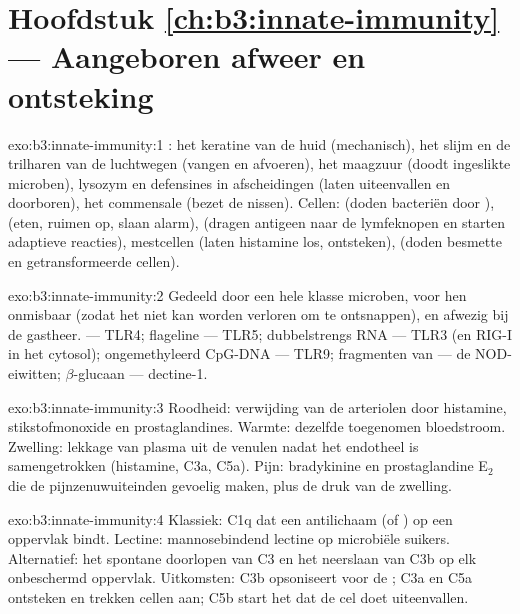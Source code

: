 \section*{Hoofdstuk \ref{ch:b3:innate-immunity} --- Aangeboren afweer en ontsteking}

\begin{solution}{exo:b3:innate-immunity:1}
: het keratine van de huid (mechanisch), het slijm en de
trilharen van de luchtwegen (vangen en afvoeren), het maagzuur (doodt
ingeslikte microben), lysozym en defensines in afscheidingen (laten
uiteenvallen en doorboren), het commensale  (bezet de
nissen). Cellen:  (doden bacteriën door ),
 (eten, ruimen op, slaan alarm),  (dragen
antigeen naar de lymfeknopen en starten adaptieve reacties),
mestcellen (laten histamine los, ontsteken), 
(doden besmette en getransformeerde cellen).
\end{solution}

\begin{solution}{exo:b3:innate-immunity:2}
Gedeeld door een hele klasse microben, voor hen onmisbaar (zodat het
niet kan worden verloren om te ontsnappen), en afwezig bij de gastheer.
 --- TLR4; flageline --- TLR5; dubbelstrengs RNA ---
TLR3 (en RIG-I in het cytosol); ongemethyleerd CpG-DNA --- TLR9;
fragmenten van  --- de NOD-eiwitten; $\beta$-glucaan ---
dectine-1.
\end{solution}

\begin{solution}{exo:b3:innate-immunity:3}
Roodheid: verwijding van de arteriolen door histamine,
stikstofmonoxide en prostaglandines. Warmte: dezelfde toegenomen
bloedstroom. Zwelling: lekkage van plasma uit de venulen nadat het
endotheel is samengetrokken (histamine, C3a, C5a). Pijn: bradykinine en
prostaglandine E$_{2}$ die de pijnzenuwuiteinden gevoelig maken, plus de
druk van de zwelling.
\end{solution}

\begin{solution}{exo:b3:innate-immunity:4}
Klassiek: C1q dat een antilichaam (of ) op een
oppervlak bindt. Lectine: mannosebindend lectine op microbiële suikers.
Alternatief: het spontane doorlopen van C3 en het neerslaan van C3b op
elk onbeschermd oppervlak. Uitkomsten: C3b opsoniseert voor de
; C3a en C5a ontsteken en trekken cellen aan; C5b start het
 dat de cel doet uiteenvallen.
\end{solution}

